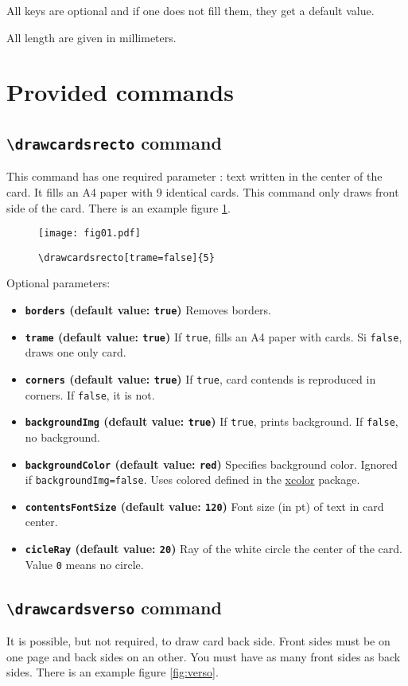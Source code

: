 \documentclass[a4paper, 12pt]{article}
\newcommand{\key}[3]{\textbf{\texttt{#1} (default value: \texttt{#2})} #3}
\newcommand{\commande}[1]{\texttt{\textbackslash#1}}
\begin{document}
All keys are optional and if one does not fill them, they get a default value.

All length are given in millimeters.

\section{Provided commands}
	\subsection{\commande{drawcardsrecto} command}
This command has one required parameter : text written in the center of the card. It fills an A4 paper with 9 identical cards. This command only draws front side of the card. There is an example figure \ref{fig:recto}.
\begin{figure}[h]\begin{center}
	\caption{\commande{drawcardsrecto[trame=false]\{5\}}}
	\texttt{[image: fig01.pdf]}\label{fig:recto}
\end{center}\end{figure}

Optional parameters:
\begin{itemize}
	\item \key{borders}{true}{Removes borders.}
	\item \key{trame}{true}{If \texttt{true}, fills an A4 paper with cards. Si \texttt{false}, draws one only card.}
	\item \key{corners}{true}{If \texttt{true}, card contends is reproduced in corners. If \texttt{false}, it is not.}
	\item \key{backgroundImg}{true}{If \texttt{true}, prints background. If \texttt{false}, no background.}
	\item \key{backgroundColor}{red}{Specifies background color. Ignored if \texttt{backgroundImg=false}. Uses colored defined in the \href{https://www.ctan.org/pkg/xcolor}{xcolor} package.}
	\item \key{contentsFontSize}{120}{Font size (in pt) of text in card center.}
	\item \key{cicleRay}{20}{Ray of the white circle the center of the card. Value \texttt 0 means no circle.}
\end{itemize}


	\subsection{\commande{drawcardsverso} command}
It is possible, but not required, to draw card back side. Front sides must be on one page and back sides on an other. You must have as many front sides as back sides. There is an example figure \ref{fig:verso}.
\end{document}

